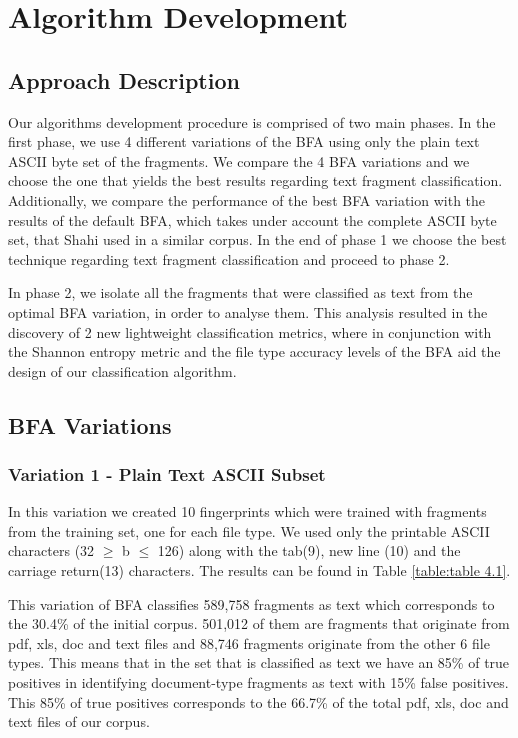 \chapter{Algorithm Development}

\section{Approach Description}
Our algorithms development procedure is comprised of two main phases. In the first phase, we use 4 different variations of the BFA using only the plain text ASCII byte set of the fragments. We compare the 4 BFA variations and we choose the one that yields the best results regarding text fragment classification. Additionally, we compare the performance of the best BFA variation with the results of the default BFA, which takes under account the complete ASCII byte set, that Shahi\cite{Ashim} used in a similar corpus. In the end of phase 1 we choose the best technique regarding text fragment classification and proceed to phase 2.

In phase 2, we isolate all the fragments that were classified as text from the optimal BFA variation, in order to analyse them. This analysis resulted in the discovery of 2 new lightweight classification metrics, where in conjunction with the Shannon entropy\cite{Shannon} metric and the file type accuracy levels of the BFA aid the design of our classification algorithm.
\FloatBarrier

\section{BFA Variations}

\subsection{Variation 1 - Plain Text ASCII Subset}

In this variation we created 10 fingerprints which were trained with fragments from the training set, one for each file type. We used only the printable ASCII characters (32 $\geq$  b $\leq$ 126) along with the tab(9), new line (10) and the carriage return(13) characters. The results can be found in Table \ref{table:table 4.1}.

 This variation of BFA classifies 589,758 fragments as text which corresponds to the 30.4\% of the initial corpus. 501,012 of them are fragments that originate from pdf, xls, doc and text files and 88,746 fragments originate from the other 6 file types. This means that in the set that is classified as text we have an 85\% of true positives in identifying document-type fragments as text with 15\% false positives. This 85\% of true positives corresponds to the 66.7\% of the total pdf, xls, doc and text files of our corpus.\\

